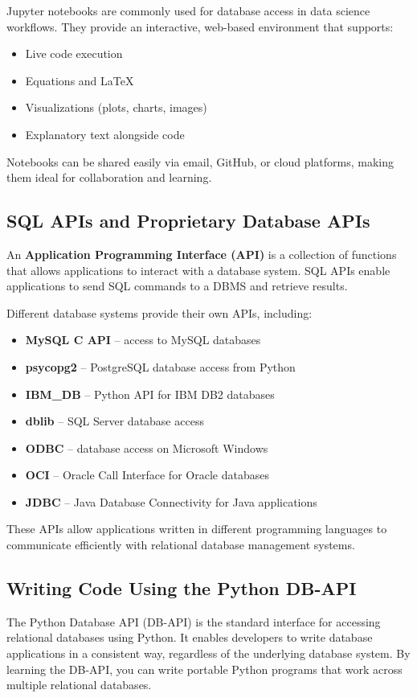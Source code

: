 \documentclass{article}
\begin{document}
Jupyter notebooks are commonly used for database access in data science workflows.  
They provide an interactive, web-based environment that supports:
\begin{itemize}
    \item Live code execution
    \item Equations and LaTeX
    \item Visualizations (plots, charts, images)
    \item Explanatory text alongside code
\end{itemize}
Notebooks can be shared easily via email, GitHub, or cloud platforms, making them ideal for collaboration and learning.

\subsection{SQL APIs and Proprietary Database APIs}

An \textbf{Application Programming Interface (API)} is a collection of functions that allows applications to interact with a database system.  
SQL APIs enable applications to send SQL commands to a DBMS and retrieve results.

Different database systems provide their own APIs, including:
\begin{itemize}
    \item \textbf{MySQL C API} – access to MySQL databases
    \item \textbf{psycopg2} – PostgreSQL database access from Python
    \item \textbf{IBM\_DB} – Python API for IBM DB2 databases
    \item \textbf{dblib} – SQL Server database access
    \item \textbf{ODBC} – database access on Microsoft Windows
    \item \textbf{OCI} – Oracle Call Interface for Oracle databases
    \item \textbf{JDBC} – Java Database Connectivity for Java applications
\end{itemize}
These APIs allow applications written in different programming languages to communicate efficiently with relational database management systems.

\subsection{Writing Code Using the Python DB-API}

The Python Database API (DB-API) is the standard interface for accessing relational databases using Python.  
It enables developers to write database applications in a consistent way, regardless of the underlying database system.  
By learning the DB-API, you can write portable Python programs that work across multiple relational databases.
\end{document}
